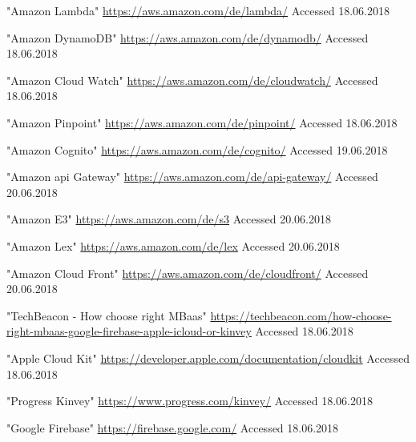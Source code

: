 \documentclass[journal]{IEEEtran}
\begin{document}
%
%
%
\begin{thebibliography}{1}
"Amazon Lambda"
\url{https://aws.amazon.com/de/lambda/} 
Accessed 18.06.2018

"Amazon DynamoDB"
\url{https://aws.amazon.com/de/dynamodb/}
Accessed 18.06.2018

"Amazon Cloud Watch"
\url{https://aws.amazon.com/de/cloudwatch/}
Accessed 18.06.2018

"Amazon Pinpoint"
\url{https://aws.amazon.com/de/pinpoint/}
Accessed 18.06.2018

"Amazon Cognito"
\url{https://aws.amazon.com/de/cognito/}
Accessed 19.06.2018

"Amazon \gls{api} Gateway"
\url{https://aws.amazon.com/de/api-gateway/}
Accessed 20.06.2018

"Amazon E3"
\url{https://aws.amazon.com/de/s3}
Accessed 20.06.2018

"Amazon Lex"
\url{https://aws.amazon.com/de/lex}
Accessed 20.06.2018

"Amazon Cloud Front"
\url{https://aws.amazon.com/de/cloudfront/}
Accessed 20.06.2018

"TechBeacon - How choose right MBaas"
\url{https://techbeacon.com/how-choose-right-mbaas-google-firebase-apple-icloud-or-kinvey}
Accessed 18.06.2018

"Apple Cloud Kit"
\url{https://developer.apple.com/documentation/cloudkit}
Accessed 18.06.2018

"Progress Kinvey"
\url{https://www.progress.com/kinvey/}
Accessed 18.06.2018

"Google Firebase"
\url{https://firebase.google.com/}
Accessed 18.06.2018


\end{thebibliography}
\end{document}
